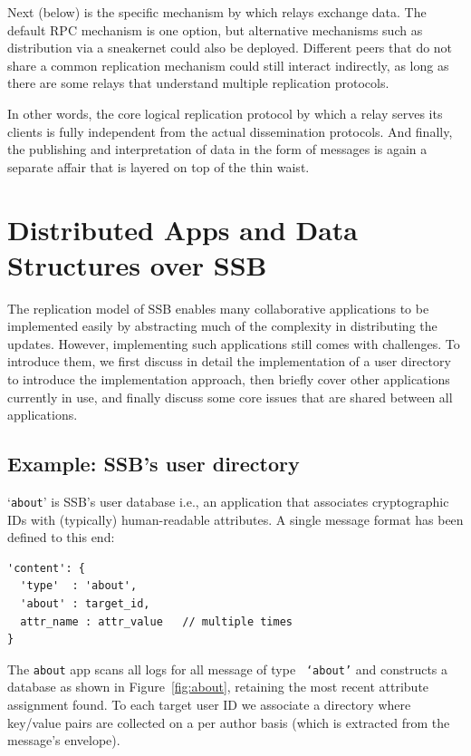 \documentclass[9pt,sigconf]{acmart}
\begin{document}
Next (below) is the specific mechanism by which relays exchange data. The default RPC mechanism is one option, but alternative mechanisms such as distribution via a sneakernet could also be deployed. Different peers that do not share a common replication mechanism could still interact indirectly, as long as there are some relays that understand multiple replication protocols.

In other words, the core logical replication protocol by which a relay serves its clients is fully independent from the actual dissemination protocols. And finally, the publishing and interpretation of data in the form of messages is again a separate affair that is layered on top of the thin waist.

\section{Distributed Apps and Data Structures over SSB}
\label{sect:apps}


The replication model of SSB enables many collaborative applications to be implemented easily by abstracting much of the complexity in distributing the updates. However, implementing such applications still comes with challenges. To introduce them, we first discuss in detail the implementation of a user directory to introduce the implementation approach, then briefly cover other applications currently in use, and finally discuss some core issues that are shared between all applications.

\subsection{Example: SSB's user directory}
\label{ssect:about}

`{\small\tt about}' is SSB's user database i.e., an application that
associates cryptographic IDs with (typically) human-readable
attributes. A single message format has been defined to this end:
{\small\begin{verbatim}
'content': {
  'type'  : 'about',
  'about' : target_id,
  attr_name : attr_value   // multiple times
}
\end{verbatim}}

\noindent
The {\small\tt about} app scans all logs for all message of type {\small\tt
  `about'} and constructs a database as shown in
Figure~\ref{fig:about}, retaining the most recent attribute assignment
found.  To each target user ID we associate a directory where
key/value pairs are collected on a per author basis (which is extracted
from the message's envelope).
\end{document}
